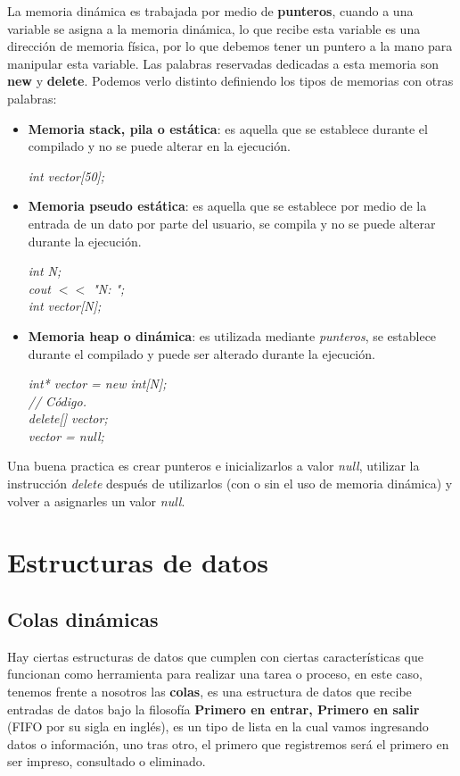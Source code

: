 La memoria dinámica es trabajada por medio de \textbf{punteros}, cuando a una variable se asigna a la memoria dinámica, lo que recibe esta variable es una dirección de memoria física, por lo que debemos tener un puntero a la mano para manipular esta variable. Las palabras reservadas dedicadas a esta memoria son \textbf{new} y \textbf{delete}. Podemos verlo distinto definiendo los tipos de memorias con otras palabras:
\begin{itemize}
    \item \textbf{Memoria stack, pila o estática}: es aquella que se establece durante el compilado y no se puede alterar en la ejecución.
    \begin{center}
		\textit{int vector[50];}
	\end{center}
    \item \textbf{Memoria pseudo estática}: es aquella que se establece por medio de la entrada de un dato por parte del usuario, se compila y no se puede alterar durante la ejecución.
    \begin{center}
        \textit{
			int N; \\
			cout $<<$ "N: "; \\
			int vector[N];
       	}
    \end{center}
    \item \textbf{Memoria heap o dinámica}: es utilizada mediante \textit{punteros}, se establece durante el compilado y puede ser alterado durante la ejecución.
    \begin{center}
		\textit{
			int* vector = new int[N]; \\
			// Código. \\
			delete[] vector; \\
			vector = null;
		}
	\end{center}
\end{itemize}

Una buena practica es crear punteros e inicializarlos a valor \textit{null}, utilizar la instrucción \textit{delete} después de utilizarlos (con o sin el uso de memoria dinámica) y volver a asignarles un valor \textit{null}.



\section{Estructuras de datos}


\subsection{Colas dinámicas}
\hspace{0.55cm}Hay ciertas estructuras de datos que cumplen con ciertas características que funcionan como herramienta para realizar una tarea o proceso, en este caso, tenemos frente a nosotros las \textbf{colas}, es una estructura de datos que recibe entradas de datos bajo la filosofía \textbf{Primero en entrar, Primero en salir} (FIFO por su sigla en inglés), es un tipo de lista en la cual vamos ingresando datos o información, uno tras otro, el primero que registremos será el primero en ser impreso, consultado o eliminado.

